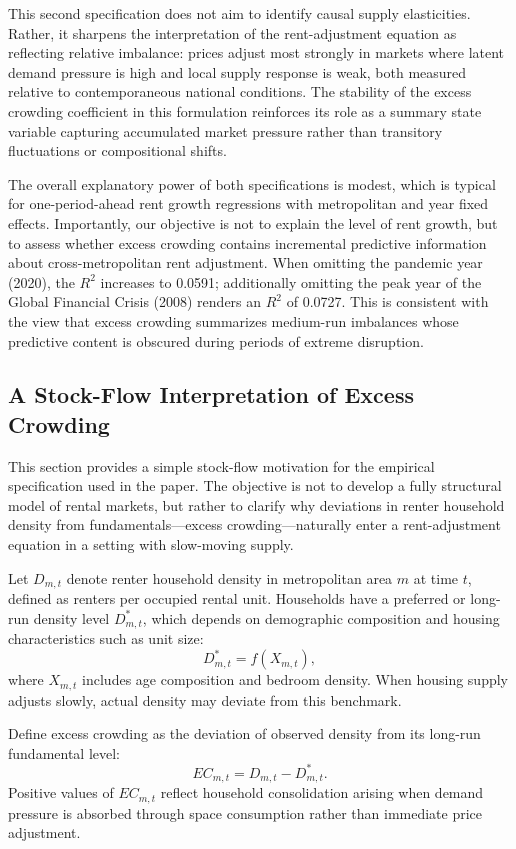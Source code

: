 \documentclass[pdflatex,sn-basic]{sn-jnl}%
\theoremstyle{thmstyleone}%
\theoremstyle{thmstyletwo}%
\theoremstyle{thmstylethree}%
\begin{document}
This second specification does not aim to identify causal supply elasticities. Rather, it sharpens
the interpretation of the rent-adjustment equation as reflecting relative imbalance: prices
adjust most strongly in markets where latent demand pressure is high and local supply
response is weak, both measured relative to contemporaneous national conditions. The
stability of the excess crowding coefficient in this formulation reinforces its role as a
summary state variable capturing accumulated market pressure rather than transitory
fluctuations or compositional shifts.

The overall explanatory power of both specifications is modest, which is typical for one-period-ahead rent growth regressions with metropolitan and year fixed effects. Importantly, our objective is not to explain the level of rent growth, but to assess whether excess crowding contains incremental predictive information about cross-metropolitan rent adjustment. When omitting the pandemic year (2020), the $R^{2}$ increases to 0.0591; additionally omitting the peak year of the Global Financial Crisis (2008) renders an $R^{2}$ of 0.0727. This is consistent with the view that excess crowding summarizes medium-run imbalances whose predictive content is obscured during periods of extreme disruption.

\subsection{A Stock-Flow Interpretation of Excess Crowding}

This section provides a simple stock-flow motivation for the empirical specification
used in the paper. The objective is not to develop a fully structural model of rental
markets, but rather to clarify why deviations in renter household density from
fundamentals—excess crowding—naturally enter a rent-adjustment equation in a setting
with slow-moving supply.

Let $D_{m,t}$ denote renter household density in metropolitan area $m$ at time $t$,
defined as renters per occupied rental unit. Households have a preferred or
long-run density level $D^{*}_{m,t}$, which depends on demographic composition and
housing characteristics such as unit size:
\[
D^{*}_{m,t} = f(X_{m,t}),
\]
where $X_{m,t}$ includes age composition and bedroom density. When housing supply
adjusts slowly, actual density may deviate from this benchmark.

Define excess crowding as the deviation of observed density from its long-run
fundamental level:
\[
EC_{m,t} = D_{m,t} - D^{*}_{m,t}.
\]
Positive values of $EC_{m,t}$ reflect household consolidation arising when demand
pressure is absorbed through space consumption rather than immediate price adjustment.
\end{document}
